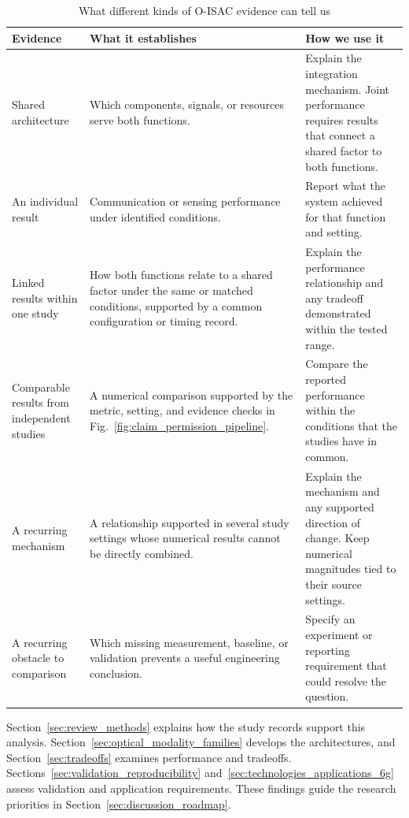 \begin{table}[!t]
\caption{What different kinds of O-ISAC evidence can tell us}
\label{tab:comparison_record}
\centering
\footnotesize
\setlength{\tabcolsep}{4pt}
\renewcommand{\arraystretch}{1.15}
\begin{tabularx}{\textwidth}{@{}>{\raggedright\arraybackslash}p{}
>{\raggedright\arraybackslash}p{}
>{\raggedright\arraybackslash}X@{}}
\toprule
Evidence & What it establishes & How we use it \\
\midrule
Shared architecture &
Which components, signals, or resources serve both functions. &
Explain the integration mechanism. Joint performance requires results
that connect a shared factor to both functions. \\
\addlinespace[3pt]
An individual result &
Communication or sensing performance under identified conditions. &
Report what the system achieved for that function and setting. \\
\addlinespace[3pt]
Linked results within one study &
How both functions relate to a shared factor under the same or matched
conditions, supported by a common configuration or timing record. &
Explain the performance relationship and any tradeoff demonstrated within
the tested range. \\
\addlinespace[3pt]
Comparable results from independent studies &
A numerical comparison supported by the metric, setting, and evidence
checks in Fig.~\ref{fig:claim_permission_pipeline}. &
Compare the reported performance within the conditions that the studies
have in common. \\
\addlinespace[3pt]
A recurring mechanism &
A relationship supported in several study settings whose numerical results
cannot be directly combined. &
Explain the mechanism and any supported direction of change.
Keep numerical magnitudes tied to their source settings. \\
\addlinespace[3pt]
A recurring obstacle to comparison &
Which missing measurement, baseline, or validation prevents a useful
engineering conclusion. &
Specify an experiment or reporting requirement that could resolve the
question. \\
\bottomrule
\end{tabularx}
\end{table}

Section~\ref{sec:review_methods} explains how the study records support this
analysis. Section~\ref{sec:optical_modality_families} develops the architectures,
and Section~\ref{sec:tradeoffs} examines performance and tradeoffs.
Sections~\ref{sec:validation_reproducibility}
and~\ref{sec:technologies_applications_6g} assess validation and application
requirements. These findings guide the research priorities in
Section~\ref{sec:discussion_roadmap}.

\FloatBarrier
